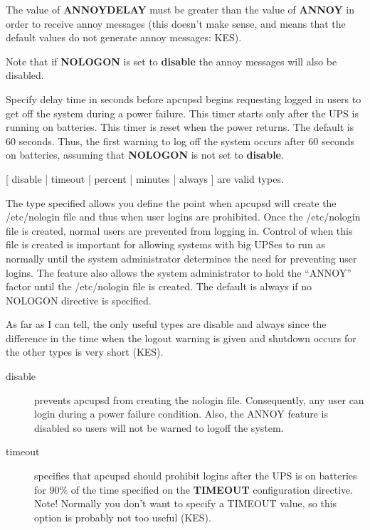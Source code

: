 {{{{{{{\begin{description}
The value of {\bf ANNOYDELAY} must be greater than the value of {\bf ANNOY} in
order to receive annoy messages (this doesn't make sense, and means that the
default values do not generate annoy messages: KES).  

Note that if {\bf NOLOGON} is set to {\bf disable} the annoy messages will
also be disabled.  

\item [ANNOYDELAY \lt{}time in seconds\gt{}]
   Specify delay time in seconds before apcupsd begins requesting logged in users
to get off the system during a power failure. This timer starts only after the
UPS is running on batteries. This timer is reset when the power returns. The
default is 60 seconds. Thus, the first warning to log off the system occurs
after 60 seconds on batteries, assuming that {\bf NOLOGON} is not set to {\bf
disable}.  

\item [NOLOGON \lt{}specifies when apcupsd should prevent user
   logins\gt{}]
[ disable | timeout | percent | minutes | always ] are valid types.  

The type specified allows you define the point when apcupsd will create the
/etc/nologin file and thus when user logins are prohibited. Once the
/etc/nologin file is created, normal users are prevented from logging in.
Control of when this file is created is important for allowing systems with
big UPSes to run as normally until the system administrator determines the
need for preventing user logins. The feature also allows the system
administrator to hold the ``ANNOY'' factor until the /etc/nologin file is
created. The default is always if no NOLOGON directive is specified.  

As far as I can tell, the only useful types are disable and always since the
difference in the time when the logout warning is given and shutdown occurs
for the other types is very short (KES).  

\begin{description}

\item [disable]
   prevents apcupsd from creating the nologin file.  Consequently, any user can
login during a power failure condition.  Also, the ANNOY feature is disabled
so users will not be warned to logoff the system.  

\item [timeout]
   specifies that apcupsd should prohibit logins after the UPS is on batteries
for 90\% of the time specified on the {\bf TIMEOUT} configuration directive.
Note! Normally you don't want to specify a TIMEOUT value, so this option is
probably not too useful (KES).  


\end{description}
\end{description}}}}}}}}
